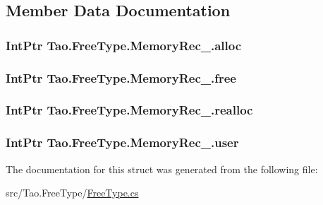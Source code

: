 \subsection{Member Data Documentation}
\hypertarget{struct_tao_1_1_free_type_1_1_memory_rec___a95c6689303b5b2933a9aa75270d02f6f}{
\subsubsection[{alloc}]{\setlength{\rightskip}{0pt plus 5cm}IntPtr {\bf Tao.FreeType.MemoryRec\_\-.alloc}}}
\label{struct_tao_1_1_free_type_1_1_memory_rec___a95c6689303b5b2933a9aa75270d02f6f}
\hypertarget{struct_tao_1_1_free_type_1_1_memory_rec___a40a998b40bcf18a35fdc8581f2fb981c}{
\subsubsection[{free}]{\setlength{\rightskip}{0pt plus 5cm}IntPtr {\bf Tao.FreeType.MemoryRec\_\-.free}}}
\label{struct_tao_1_1_free_type_1_1_memory_rec___a40a998b40bcf18a35fdc8581f2fb981c}
\hypertarget{struct_tao_1_1_free_type_1_1_memory_rec___a19109acbb86f519f31a5ce08bac4796e}{
\subsubsection[{realloc}]{\setlength{\rightskip}{0pt plus 5cm}IntPtr {\bf Tao.FreeType.MemoryRec\_\-.realloc}}}
\label{struct_tao_1_1_free_type_1_1_memory_rec___a19109acbb86f519f31a5ce08bac4796e}
\hypertarget{struct_tao_1_1_free_type_1_1_memory_rec___a63dc41e50dda1d32e020b42af1a74062}{
\subsubsection[{user}]{\setlength{\rightskip}{0pt plus 5cm}IntPtr {\bf Tao.FreeType.MemoryRec\_\-.user}}}
\label{struct_tao_1_1_free_type_1_1_memory_rec___a63dc41e50dda1d32e020b42af1a74062}


The documentation for this struct was generated from the following file:\begin{DoxyCompactItemize}
\item 
src/Tao.FreeType/\hyperlink{_free_type_8cs}{FreeType.cs}\end{DoxyCompactItemize}
